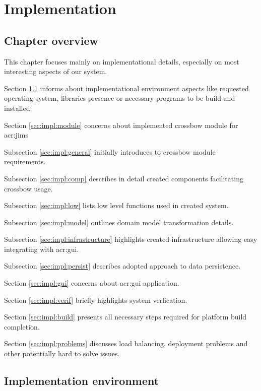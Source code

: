 \documentclass[11pt]{book}
\begin{document}
  \chapter{Implementation}
    
    \section*{Chapter overview}
	
      This chapter focuses mainly on implementational details, especially on most interesting aspects of our system.
		
      Section \ref{sec:impl:env} informs about implementational environment aspects like requested operating system,
      libraries presence or necessary programs to be build and installed. 
	  
	  Section \ref{sec:impl:module} concerns about implemented crossbow module for \gls{acr:jims}
	  
		\quad Subsection \ref{sec:impl:general} initially introduces to crossbow module requirements.

		\quad Subsection \ref{sec:impl:comp} describes in detail created components facilitating crossbow usage.
		
		\quad Subsection \ref{sec:impl:low} lists low level functions used in created system.

		\quad Subsection \ref{sec:impl:model} outlines domain model transformation details.
		
		\quad Subsection \ref{sec:impl:infrastructure} highlights created infrastructure allowing easy integrating with \gls{acr:gui}.
		
		\quad Subsection \ref{sec:impl:persist} describes adopted approach to data persistence.
		
	  
	  Section \ref{sec:impl:gui} concerns about \gls{acr:gui} application.
	  
	  Section \ref{sec:impl:verif} briefly highlights system verfication.
	
	  Section \ref{sec:impl:build} presents all necessary steps required for platform build completion.
	  
          Section \ref{sec:impl:problems} discusses load balancing, deployment problems and other potentially hard to solve issues.
		


    \section{Implementation environment}
    \label{sec:impl:env}
\end{document}
